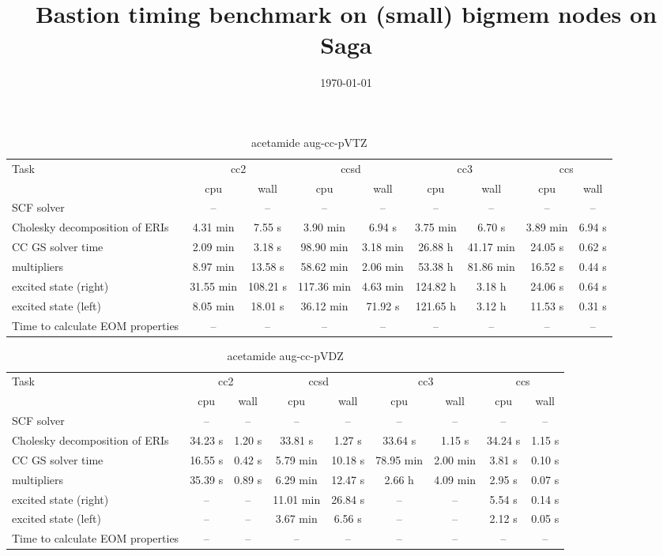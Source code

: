 \documentclass{article}
\title{Bastion timing benchmark on (small) bigmem nodes on Saga}
\date{\today}
\begin{document}
\maketitle
\begin{table}
\caption{acetamide aug-cc-pVTZ}
\begin{tabular}{lcccccccc}
\toprule
Task & \multicolumn{2}{c}{cc2} & \multicolumn{2}{c}{ccsd} & \multicolumn{2}{c}{cc3} & \multicolumn{2}{c}{ccs}\\
\cmidrule(lr){2-3}\cmidrule(lr){4-5}\cmidrule(lr){6-7}\cmidrule(lr){8-9}
 & cpu & wall & cpu & wall & cpu & wall & cpu & wall\\
\midrule
SCF solver & -- & -- & -- & -- & -- & -- & -- & --\\
Cholesky decomposition of ERIs & 4.31 min & 7.55 s & 3.90 min & 6.94 s & 3.75 min & 6.70 s & 3.89 min & 6.94 s\\
CC GS solver time & 2.09 min & 3.18 s & 98.90 min & 3.18 min & 26.88 h & 41.17 min & 24.05 s & 0.62 s\\
multipliers & 8.97 min & 13.58 s & 58.62 min & 2.06 min & 53.38 h & 81.86 min & 16.52 s & 0.44 s\\
excited state (right) & 31.55 min & 108.21 s & 117.36 min & 4.63 min & 124.82 h & 3.18 h & 24.06 s & 0.64 s\\
excited state (left) & 8.05 min & 18.01 s & 36.12 min & 71.92 s & 121.65 h & 3.12 h & 11.53 s & 0.31 s\\
Time to calculate EOM properties & -- & -- & -- & -- & -- & -- & -- & --\\
\bottomrule
\end{tabular}
\end{table}
\begin{table}
\caption{acetamide aug-cc-pVDZ}
\begin{tabular}{lcccccccc}
\toprule
Task & \multicolumn{2}{c}{cc2} & \multicolumn{2}{c}{ccsd} & \multicolumn{2}{c}{cc3} & \multicolumn{2}{c}{ccs}\\
\cmidrule(lr){2-3}\cmidrule(lr){4-5}\cmidrule(lr){6-7}\cmidrule(lr){8-9}
 & cpu & wall & cpu & wall & cpu & wall & cpu & wall\\
\midrule
SCF solver & -- & -- & -- & -- & -- & -- & -- & --\\
Cholesky decomposition of ERIs & 34.23 s & 1.20 s & 33.81 s & 1.27 s & 33.64 s & 1.15 s & 34.24 s & 1.15 s\\
CC GS solver time & 16.55 s & 0.42 s & 5.79 min & 10.18 s & 78.95 min & 2.00 min & 3.81 s & 0.10 s\\
multipliers & 35.39 s & 0.89 s & 6.29 min & 12.47 s & 2.66 h & 4.09 min & 2.95 s & 0.07 s\\
excited state (right) & -- & -- & 11.01 min & 26.84 s & -- & -- & 5.54 s & 0.14 s\\
excited state (left) & -- & -- & 3.67 min & 6.56 s & -- & -- & 2.12 s & 0.05 s\\
Time to calculate EOM properties & -- & -- & -- & -- & -- & -- & -- & --\\
\bottomrule
\end{tabular}
\end{table}
\end{document}
